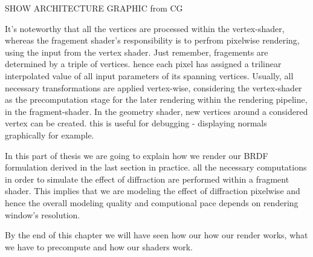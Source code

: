SHOW ARCHITECTURE GRAPHIC from CG


It's noteworthy that all the vertices are processed within the vertex-shader, whereas the fragement shader's responsibility is to perfrom pixelwise rendering, using the input from the vertex shader. Just remember, fragements are determined by a triple of vertices. hence each pixel has assigned a trilinear interpolated value of all input parameters of its spanning vertices.
Usually, all necessary transformations are applied vertex-wise, considering the vertex-shader as the precomputation stage for the later rendering within the rendering pipeline, in the fragment-shader. In the geometry shader, new vertices around a considered vertex can be created. this is useful for debugging - displaying normals graphically for example.

In this part of thesis we are going to explain how we render our BRDF formulation derived in the last section in practice. all the necessary computations in order to simulate the effect of diffraction are performed within a fragment shader. This implies that we are modeling the effect of diffraction pixelwise and hence the overall modeling quality and computional pace depends on rendering window's resolution.

By the end of this chapter we will have seen how our how our render works, what we have to precompute and how our shaders work. 



